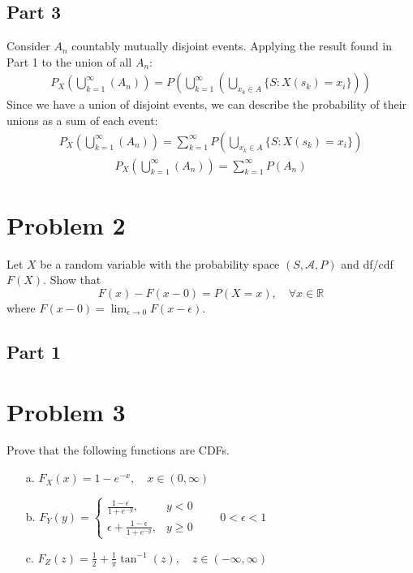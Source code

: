 \documentclass{article}
\begin{document}
\subsection*{Part 3}
Consider $A_n$ countably mutually disjoint events. Applying the result found in Part 1 to the union of all $A_n$:
\begin{align*}
P_X(\bigcup_{k=1}^{\infty}(A_n)) = P(\bigcup_{k=1}^{\infty}(\bigcup_{x_k\in A}\{S:X(s_k)=x_i\}))
\end{align*}
Since we have a union of disjoint events, we can describe the probability of their unions as a sum of each event:
\begin{align*}
P_X(\bigcup_{k=1}^{\infty}(A_n)) = \sum_{k=1}^{\infty}P(\bigcup_{x_k\in A}\{S:X(s_k)=x_i\})
\end{align*}
\begin{align*}
\boxed{P_X(\bigcup_{k=1}^{\infty}(A_n)) = \sum_{k=1}^{\infty}P(A_n)}
\end{align*}
\clearpage

\section*{Problem 2}
Let $X$ be a random variable with the probability space $(S,\mathcal{A},P)$ and df/cdf $F(X)$. Show that
    \[
    F(x)-F(x-0) = P(X=x), \quad \forall x\in \mathbb{R}
    \]
    where $F(x-0) = \displaystyle \lim_{\epsilon \rightarrow 0} F(x-\epsilon)$.


\subsection*{Part 1}
\clearpage
\section*{Problem 3}
Prove that the following functions are CDFs.
    \begin{enumerate}
      \item[a.]
        $F_X(x) = 1 - e^{-x}, \quad x\in(0,\infty)$
      \item[]
      \item[b.]
        $F_Y(y) = \begin{cases} \frac{1-\epsilon}{1+e^{-y}}, & y<0 \\ \epsilon +\frac{1-\epsilon}{1+e^{-y}}, & y\geq 0\end{cases} \qquad 0<\epsilon < 1$
      \item[]
      \item[c.]
        $F_Z(z) = \frac{1}{2} +\frac{1}{\pi} \tan^{-1}(z), \quad z\in(-\infty,\infty)$
      \item[]
    \end{enumerate}
\end{document}
